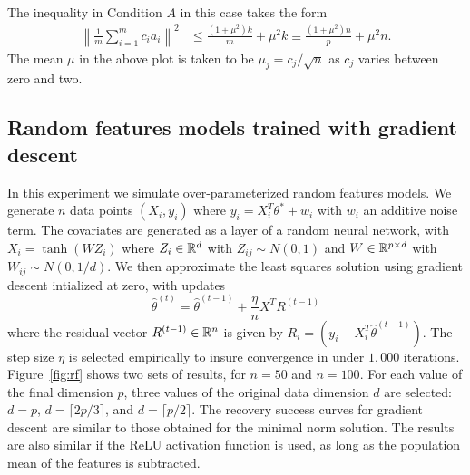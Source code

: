 The inequality in Condition $A$ in this case takes the form
\begin{align*}
  \left\|\frac{1}{m}\sum_{i=1}^m c_i a_i\right\|^2 &\leq \frac{(1+\mu^2)k}{m} + \mu^2 k
   \equiv \frac{(1+\mu^2)n}{p} + \mu^2 n.
\end{align*}
The mean $\mu$ in the above plot is taken to be $\mu_j = c_j / \sqrt{n}$ as $c_j$ varies between zero and two.

\subsection{Random features models trained with gradient descent}

In this experiment we simulate over-parameterized random features models.
We generate $n$ data points $(X_i, y_i)$ where
$y_i = X_i^T \theta^* + w_i$ with $w_i$ an additive noise term. The covariates are generated
as a layer of a random neural network, with $X_i = \tanh(WZ_i)$ where $Z_i \in\mathbb{R}^d$ with $Z_{ij} \sim N(0,1)$
and $W\in\mathbb{R}^{p\times d}$ with $W_{ij} \sim N(0, 1/d)$. We then approximate the least squares
solution using gradient descent intialized at zero, with updates
\begin{equation}
  \hat\theta^{(t)} = \hat\theta^{(t-1)} + \frac{\eta}{n} X^T R^{(t-1)}
\end{equation}
where the residual vector $R^{(t-1)}\in\mathbb{R}^n$ is given by $R_i = (y_i - X_i^ T\hat\theta^{(t-1)})$.
The step size $\eta$ is selected empirically to insure convergence in under $1{,}000$ iterations.
Figure~\ref{fig:rf} shows two sets of results, for $n=50$ and $n=100$. For each value of the final dimension $p$,
three values of the original data dimension $d$ are selected: $d=p$, $d=\lceil 2p/3\rceil$,
and $d=\lceil p/2\rceil$. The recovery success curves for gradient descent are similar to those obtained for the minimal norm solution. The results are also similar if the ReLU activation function is used, as long as the population mean of the features is subtracted.

